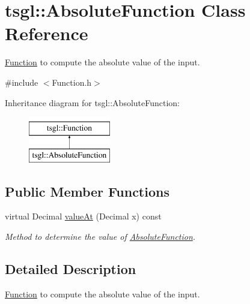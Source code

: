 \hypertarget{classtsgl_1_1_absolute_function}{\section{tsgl\-:\-:Absolute\-Function Class Reference}
\label{classtsgl_1_1_absolute_function}
}


\hyperlink{classtsgl_1_1_function}{Function} to compute the absolute value of the input.  




{\ttfamily \#include $<$Function.\-h$>$}

Inheritance diagram for tsgl\-:\-:Absolute\-Function\-:\begin{figure}[H]
\begin{center}
\leavevmode
\includegraphics[height=2.000000cm]{classtsgl_1_1_absolute_function}
\end{center}
\end{figure}
\subsection*{Public Member Functions}
\begin{DoxyCompactItemize}
\item 
virtual Decimal \hyperlink{classtsgl_1_1_absolute_function_a29b4dd051d17e92b4f2d64b492a6ca19}{value\-At} (Decimal x) const 
\begin{DoxyCompactList}\small\item\em Method to determine the value of \hyperlink{classtsgl_1_1_absolute_function}{Absolute\-Function}. \end{DoxyCompactList}\end{DoxyCompactItemize}


\subsection{Detailed Description}
\hyperlink{classtsgl_1_1_function}{Function} to compute the absolute value of the input. 

